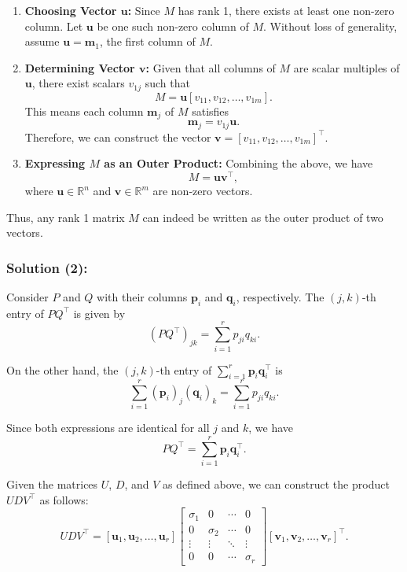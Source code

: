 \documentclass[12pt]{article}
\begin{document}
\begin{enumerate}
    \item \textbf{Choosing Vector \( \mathbf{u} \):} Since \( M \) has rank 1, there exists at least one non-zero column. Let \( \mathbf{u} \) be one such non-zero column of \( M \). Without loss of generality, assume \( \mathbf{u} = \mathbf{m}_1 \), the first column of \( M \).
    
    \item \textbf{Determining Vector \( \mathbf{v} \):} Given that all columns of \( M \) are scalar multiples of \( \mathbf{u} \), there exist scalars \( v_{1j} \) such that
    \[
    M = \mathbf{u} [v_{11}, v_{12}, \ldots, v_{1m}].
    \]
    This means each column \( \mathbf{m}_j \) of \( M \) satisfies
    \[
    \mathbf{m}_j = v_{1j} \mathbf{u}.
    \]
    Therefore, we can construct the vector \( \mathbf{v} = [v_{11}, v_{12}, \ldots, v_{1m}]^\top \).
    
    \item \textbf{Expressing \( M \) as an Outer Product:} Combining the above, we have
    \[
    M = \mathbf{u} \mathbf{v}^\top,
    \]
    where \( \mathbf{u} \in \mathbb{R}^n \) and \( \mathbf{v} \in \mathbb{R}^m \) are non-zero vectors.
\end{enumerate}

Thus, any rank 1 matrix \( M \) can indeed be written as the outer product of two vectors.

\subsubsection*{Solution (2):}

Consider \( P \) and \( Q \) with their columns \( \mathbf{p}_i \) and \( \mathbf{q}_i \), respectively. The \( (j, k) \)-th entry of \( P Q^\top \) is given by
\[
(P Q^\top)_{jk} = \sum_{i=1}^r p_{ji} q_{ki}.
\]

On the other hand, the \( (j, k) \)-th entry of \( \sum_{i=1}^r \mathbf{p}_i \mathbf{q}_i^\top \) is
\[
\sum_{i=1}^r (\mathbf{p}_i)_j (\mathbf{q}_i)_k = \sum_{i=1}^r p_{ji} q_{ki}.
\]

Since both expressions are identical for all \( j \) and \( k \), we have
\[
P Q^\top = \sum_{i=1}^r \mathbf{p}_i \mathbf{q}_i^\top.
\]

Given the matrices \( U \), \( D \), and \( V \) as defined above, we can construct the product \( U D V^\top \) as follows:
\[
U D V^\top = \left[ \mathbf{u}_1, \mathbf{u}_2, \ldots, \mathbf{u}_r \right]
\begin{bmatrix}
\sigma_1 & 0 & \cdots & 0 \\
0 & \sigma_2 & \cdots & 0 \\
\vdots & \vdots & \ddots & \vdots \\
0 & 0 & \cdots & \sigma_r
\end{bmatrix}
\left[ \mathbf{v}_1, \mathbf{v}_2, \ldots, \mathbf{v}_r \right]^\top.
\]
\end{document}
